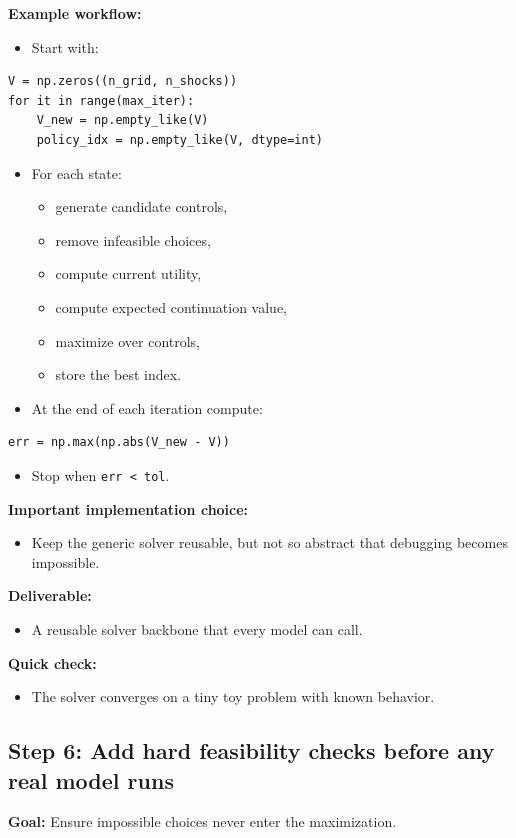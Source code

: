 \documentclass[11pt]{article}
\begin{document}
\textbf{Example workflow:}
\begin{itemize}
    \item Start with:
\end{itemize}
\begin{lstlisting}
V = np.zeros((n_grid, n_shocks))
for it in range(max_iter):
    V_new = np.empty_like(V)
    policy_idx = np.empty_like(V, dtype=int)
\end{lstlisting}
\begin{itemize}
    \item For each state:
    \begin{itemize}
        \item generate candidate controls,
        \item remove infeasible choices,
        \item compute current utility,
        \item compute expected continuation value,
        \item maximize over controls,
        \item store the best index.
    \end{itemize}
    \item At the end of each iteration compute:
\end{itemize}
\begin{lstlisting}
err = np.max(np.abs(V_new - V))
\end{lstlisting}
\begin{itemize}
    \item Stop when \verb|err < tol|.
\end{itemize}

\textbf{Important implementation choice:}
\begin{itemize}
    \item Keep the generic solver reusable, but not so abstract that debugging becomes impossible.
\end{itemize}

\textbf{Deliverable:}
\begin{itemize}
    \item A reusable solver backbone that every model can call.
\end{itemize}

\textbf{Quick check:}
\begin{itemize}
    \item The solver converges on a tiny toy problem with known behavior.
\end{itemize}

\subsection{Step 6: Add hard feasibility checks before any real model runs}
\textbf{Goal:} Ensure impossible choices never enter the maximization.
\end{document}
